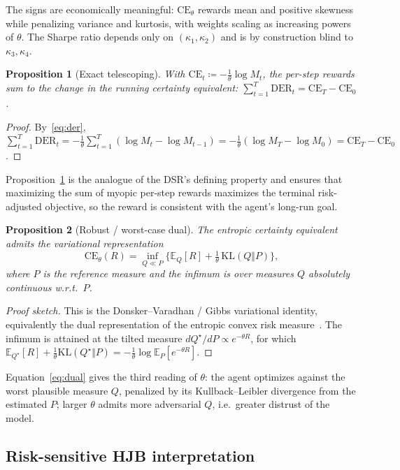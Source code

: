\documentclass[11pt]{article}
\newtheorem{proposition}{Proposition}
\theoremstyle{definition}
\newcommand{\E}{\mathbb{E}}
\newcommand{\CE}{\mathrm{CE}}
\newcommand{\DER}{\mathrm{DER}}
\newcommand{\KL}{\mathrm{KL}}
\begin{document}
The signs are economically meaningful: $\CE_\theta$ rewards mean and positive skewness
while penalizing variance and kurtosis, with weights scaling as increasing powers of
$\theta$. The Sharpe ratio depends only on $(\kappa_1,\kappa_2)$ and is by construction
blind to $\kappa_3,\kappa_4$.

\begin{proposition}[Exact telescoping]\label{prop:tele}
With $\CE_t\coloneq-\tfrac1\theta\log M_t$, the per-step rewards sum to the change in
the running certainty equivalent: $\sum_{t=1}^{T}\DER_t = \CE_T-\CE_0$.
\end{proposition}
\begin{proof}
By~\eqref{eq:der}, $\sum_{t=1}^{T}\DER_t
=-\tfrac1\theta\sum_{t=1}^T(\log M_t-\log M_{t-1})
=-\tfrac1\theta(\log M_T-\log M_0)=\CE_T-\CE_0$.
\end{proof}

Proposition~\ref{prop:tele} is the analogue of the DSR's defining property and ensures
that maximizing the sum of myopic per-step rewards maximizes the terminal
risk-adjusted objective, so the reward is consistent with the agent's long-run goal.

\begin{proposition}[Robust / worst-case dual]\label{prop:dual}
The entropic certainty equivalent admits the variational representation
\begin{equation}
\CE_\theta(R)=\inf_{Q\ll P}\Big\{\E_Q[R]+\tfrac{1}{\theta}\,\KL(Q\Vert P)\Big\},
\label{eq:dual}
\end{equation}
where $P$ is the reference measure and the infimum is over measures $Q$ absolutely
continuous w.r.t.\ $P$.
\end{proposition}
\begin{proof}[Proof sketch]
This is the Donsker--Varadhan / Gibbs variational identity, equivalently the dual
representation of the entropic convex risk measure~\cite{follmer2002}. The infimum is
attained at the tilted measure $dQ^\star/dP\propto e^{-\theta R}$, for which
$\E_{Q^\star}[R]+\tfrac1\theta\KL(Q^\star\Vert P)=-\tfrac1\theta\log\E_P[e^{-\theta R}]$.
\end{proof}

Equation~\eqref{eq:dual} gives the third reading of $\theta$: the agent optimizes
against the worst plausible measure $Q$, penalized by its Kullback--Leibler divergence
from the estimated $P$; larger $\theta$ admits more adversarial $Q$, i.e.\ greater
distrust of the model.

\subsection{Risk-sensitive HJB interpretation}
\end{document}
